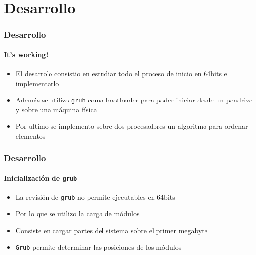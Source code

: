 \documentclass{beamer}
\begin{document}
\section{Desarrollo}
  
\begin{frame}
  \frametitle{Desarrollo}
  \framesubtitle{It's working!}
  \begin{itemize}
    \setlength{\itemsep}{20pt}
    \item El desarrolo consistio en estudiar todo el proceso de inicio en 64bits e implementarlo
    \item Además se utilizo \texttt{grub} como bootloader para poder iniciar desde un pendrive y sobre una máquina física
    \item Por ultimo se implemento sobre dos procesadores un algoritmo para ordenar elementos
  \end{itemize}
\end{frame}

\begin{frame}
  \frametitle{Desarrollo}
  \framesubtitle{Inicialización de \texttt{grub}}
  \begin{itemize}
    \setlength{\itemsep}{20pt}
   \item La revisión de \texttt{grub} no permite ejecutables en 64bits
   \item Por lo que se utilizo la carga de módulos
   \item Consiste en cargar partes del sistema sobre el primer megabyte
   \item \texttt{Grub} permite determinar las posiciones de los módulos
  \end{itemize}
\end{frame}
\end{document}
